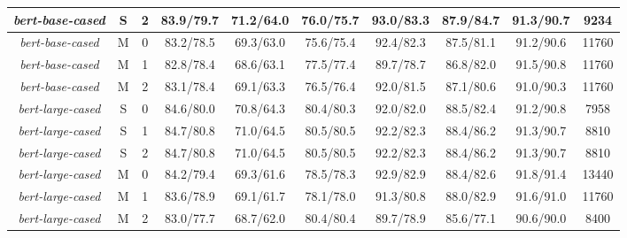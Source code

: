 \begin{table*}
\begin{tabular}{|c|c|c||c|c|c|c|c|c||c|}
\textit{bert-base-cased} & S & 2 & 83.9/79.7 & 71.2/64.0 & 76.0/75.7 & 93.0/83.3 & 87.9/84.7 & 91.3/90.7 & 9234 \\ \hline
\textit{bert-base-cased} & M & 0 & 83.2/78.5 & 69.3/63.0 & 75.6/75.4 & 92.4/82.3 & 87.5/81.1 & 91.2/90.6 & 11760 \\ \hline
\textit{bert-base-cased} & M & 1 & 82.8/78.4 & 68.6/63.1 & 77.5/77.4 & 89.7/78.7 & 86.8/82.0 & 91.5/90.8 & 11760 \\ \hline
\textit{bert-base-cased} & M & 2 & 83.1/78.4 & 69.1/63.3 & 76.5/76.4 & 92.0/81.5 & 87.1/80.6 & 91.0/90.3 & 11760 \\ \hline
\textit{bert-large-cased} & S & 0 & 84.6/80.0 & 70.8/64.3 & 80.4/80.3 & 92.0/82.0 & 88.5/82.4 & 91.2/90.8 & 7958 \\ \hline
\textit{bert-large-cased} & S & 1 & 84.7/80.8 & 71.0/64.5 & 80.5/80.5 & 92.2/82.3 & 88.4/86.2 & 91.3/90.7 & 8810 \\ \hline
\textit{bert-large-cased} & S & 2 & 84.7/80.8 & 71.0/64.5 & 80.5/80.5 & 92.2/82.3 & 88.4/86.2 & 91.3/90.7 & 8810 \\ \hline
\textit{bert-large-cased} & M & 0 & 84.2/79.4 & 69.3/61.6 & 78.5/78.3 & 92.9/82.9 & 88.4/82.6 & 91.8/91.4 & 13440 \\ \hline
\textit{bert-large-cased} & M & 1 & 83.6/78.9 & 69.1/61.7 & 78.1/78.0 & 91.3/80.8 & 88.0/82.9 & 91.6/91.0 & 11760 \\ \hline
\textit{bert-large-cased} & M & 2 & 83.0/77.7 & 68.7/62.0 & 80.4/80.4 & 89.7/78.9 & 85.6/77.1 & 90.6/90.0 & 8400 \\ \hline
\end{tabular}
\end{table*}


